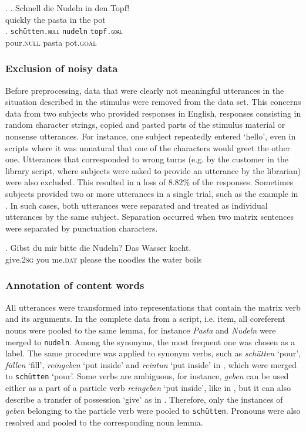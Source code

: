 \ex. \ag. Schnell die Nudeln in den Topf!\\
	  quickly the pasta in the pot\\
     \bg. \texttt{schütten.\textsc{null}} \texttt{nudeln} \texttt{topf.\textsc{goal}}\\
	pour.\textsc{null} pasta pot.\textsc{goal}\\

\subsubsection{Exclusion of noisy data}
Before preprocessing, data that were clearly not meaningful utterances in the situation described in the stimulus were removed from the data set. This concerns data from two subjects who provided responses in English, responses consisting in random character strings, copied and pasted parts of the stimulus material or nonsense utterances. For instance, one subject repeatedly entered `hello', even in scripts where it was unnatural that one of the characters would greet the other one. Utterances that corresponded to wrong turns (e.g. by the customer in the library script, where subjects were asked to provide an utterance by the librarian) were also excluded. This resulted in a loss of 8.82\% of the responses. Sometimes subjects provided two or more utterances in a single trial, such as the example in \Next. In such cases, both utterances were separated and treated as individual utterances by the same subject. Separation occurred when two matrix sentences were separated by punctuation characters.

\exg. Gibst du mir bitte die Nudeln? Das Wasser kocht.\\
      give.\textsc{2sg} you me.\textsc{dat} please the noodles the water boils\\

\subsubsection{Annotation of content words}

All utterances were transformed into representations that contain the matrix verb and its arguments. In the complete data from a script, i.e. item, all coreferent nouns were pooled to the same lemma, for instance \textit{Pasta} and \textit{Nudeln} were merged to \texttt{nudeln}. Among the synonyms, the most frequent one was chosen as a label. The same procedure was applied to synonym verbs, such as \textit{schütten} `pour', \textit{füllen} `fill', \textit{reingeben} `put inside' and \textit{reintun} `put inside' in \LLast, which were merged to \texttt{schütten} `pour'. Some verbs are ambiguous, for instance, \textit{geben} can be used either as a part of a particle verb \textit{reingeben} `put inside', like in \LLast[d], but it can also describe a transfer of possession `give' as in \Last. Therefore, only the instances of \textit{geben} belonging to the particle verb were pooled to \texttt{schütten}. Pronouns were also resolved and pooled to the corresponding noun lemma.

